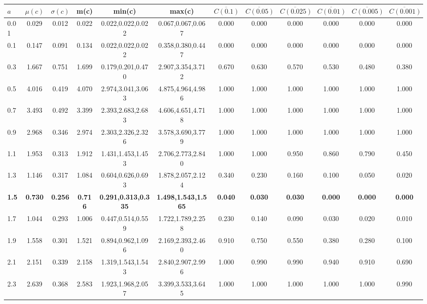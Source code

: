 \begin{table*}[h!]
\begin{center}
\begin{tabular}{| l | c | c | c | c | c | c | c | c | c | c | c |}\hline
$a$ & $\mu(c)$ & $\sigma(c)$ & m(c) & min(c) & max(c) & $\overline{C(0.1)}$ & $\overline{C(0.05)}$ & $\overline{C(0.025)}$ & $\overline{C(0.01)}$ & $\overline{C(0.005)}$ & $\overline{C(0.001)}$ \\\hline\hline
0.01 & 0.029 & 0.012 & 0.022 & 0.022,0.022,0.022 & 0.067,0.067,0.067  & 0.000  & 0.000  & 0.000  & 0.000  & 0.000  & 0.000 \\\hline
0.1 & 0.147 & 0.091 & 0.134 & 0.022,0.022,0.022 & 0.358,0.380,0.447  & 0.000  & 0.000  & 0.000  & 0.000  & 0.000  & 0.000 \\\hline
0.3 & 1.667 & 0.751 & 1.699 & 0.179,0.201,0.470 & 2.907,3.354,3.712  & 0.670  & 0.630  & 0.570  & 0.530  & 0.480  & 0.380 \\\hline
0.5 & 4.016 & 0.419 & 4.070 & 2.974,3.041,3.063 & 4.875,4.964,4.986  & 1.000  & 1.000  & 1.000  & 1.000  & 1.000  & 1.000 \\\hline
0.7 & 3.493 & 0.492 & 3.399 & 2.393,2.683,2.683 & 4.606,4.651,4.718  & 1.000  & 1.000  & 1.000  & 1.000  & 1.000  & 1.000 \\\hline
0.9 & 2.968 & 0.346 & 2.974 & 2.303,2.326,2.326 & 3.578,3.690,3.779  & 1.000  & 1.000  & 1.000  & 1.000  & 1.000  & 1.000 \\\hline
1.1 & 1.953 & 0.313 & 1.912 & 1.431,1.453,1.453 & 2.706,2.773,2.840  & 1.000  & 1.000  & 0.950  & 0.860  & 0.790  & 0.450 \\\hline
1.3 & 1.146 & 0.317 & 1.084 & 0.604,0.626,0.693 & 1.878,2.057,2.124  & 0.340  & 0.230  & 0.160  & 0.100  & 0.050  & 0.020 \\\hline
{\bf 1.5} & {\bf 0.730} & {\bf 0.256} & {\bf 0.716} & {\bf 0.291,0.313,0.335} & {\bf 1.498,1.543,1.565} & {\bf 0.040} & {\bf 0.030} & {\bf 0.030} & {\bf 0.000} & {\bf 0.000} & {\bf 0.000} \\\hline
1.7 & 1.044 & 0.293 & 1.006 & 0.447,0.514,0.559 & 1.722,1.789,2.258  & 0.230  & 0.140  & 0.090  & 0.030  & 0.020  & 0.010 \\\hline
1.9 & 1.558 & 0.301 & 1.521 & 0.894,0.962,1.096 & 2.169,2.393,2.460  & 0.910  & 0.750  & 0.550  & 0.380  & 0.280  & 0.100 \\\hline
2.1 & 2.151 & 0.339 & 2.158 & 1.319,1.543,1.543 & 2.840,2.907,2.996  & 1.000  & 0.990  & 0.990  & 0.940  & 0.910  & 0.690 \\\hline
2.3 & 2.639 & 0.368 & 2.583 & 1.923,1.968,2.057 & 3.399,3.533,3.645  & 1.000  & 1.000  & 1.000  & 1.000  & 1.000  & 0.990 \\\hline

\end{tabular}
\end{center}
\end{table*}
